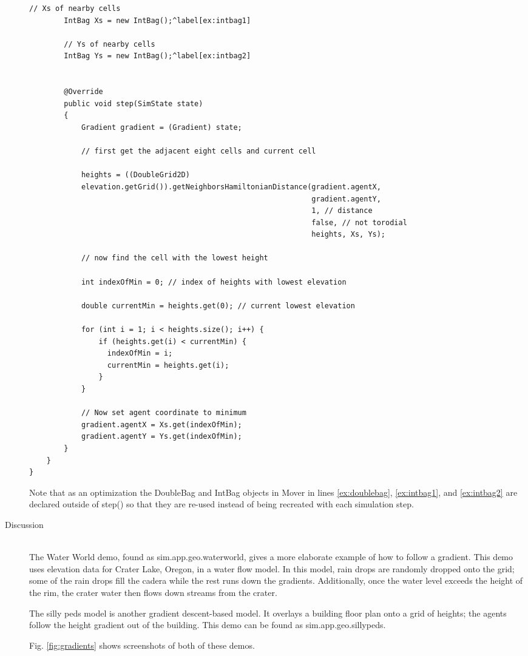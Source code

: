 \documentclass[twoside,10pt]{book}
\newcommand\class[1]{\index{Classes!{#1}}\textsf{#1}}
\newcommand\method[1]{\textsf{#1}}
\newcommand\code[1]{\textsf{#1}}
\begin{document}
\begin{description}
\begin{Verbatim}[frame=lines,framesep=5mm,commandchars=^\[\]]
        // Xs of nearby cells
        IntBag Xs = new IntBag();^label[ex:intbag1]

        // Ys of nearby cells
        IntBag Ys = new IntBag();^label[ex:intbag2]


        @Override
        public void step(SimState state)
        {
            Gradient gradient = (Gradient) state;

            // first get the adjacent eight cells and current cell

            heights = ((DoubleGrid2D)
            elevation.getGrid()).getNeighborsHamiltonianDistance(gradient.agentX,
                                                                 gradient.agentY,
                                                                 1, // distance
                                                                 false, // not torodial
                                                                 heights, Xs, Ys);

            // now find the cell with the lowest height

            int indexOfMin = 0; // index of heights with lowest elevation

            double currentMin = heights.get(0); // current lowest elevation

            for (int i = 1; i < heights.size(); i++) {
                if (heights.get(i) < currentMin) { 
                  indexOfMin = i;
                  currentMin = heights.get(i);
                }
            }

            // Now set agent coordinate to minimum
            gradient.agentX = Xs.get(indexOfMin);
            gradient.agentY = Ys.get(indexOfMin);
        }
    }
}
\end{Verbatim}

Note that as an optimization the \class{DoubleBag} and \class{IntBag}
objects in \code{Mover} in lines \ref{ex:doublebag}, \ref{ex:intbag1},
and \ref{ex:intbag2} are declared outside of \method{step()} so that
they are re-used instead of being recreated with each simulation step.

\item[Discussion]~\\
  The Water World demo, found as \code{sim.app.geo.waterworld}, gives
  a more elaborate example of how to follow a gradient.  This demo
  uses elevation data for Crater Lake, Oregon, in a water flow model.
  In this model, rain drops are randomly dropped onto the grid; some
  of the rain drops fill the cadera while the rest runs down the
  gradients. Additionally, once the water level exceeds the height of
  the rim, the crater water then flows down streams from the crater.

  The silly peds model is another gradient descent-based model.  It
  overlays a building floor plan onto a grid of heights; the agents
  follow the height gradient out of the building.  This demo can be
  found as \code{sim.app.geo.sillypeds}.

  Fig. \ref{fig:gradients} shows screenshots of both of these demos.
\end{description}
\end{document}
